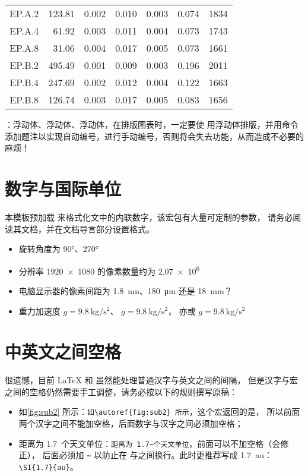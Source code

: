 \begin{longtable}[c]{c*{6}{r}}
        EP.A.2 & 123.81 & 0.002 & 0.010 & 0.003 & 0.074 & 1834 \\
        EP.A.4 & 61.92 & 0.003 & 0.011 & 0.004 & 0.073 & 1743 \\
        EP.A.8 & 31.06 & 0.004 & 0.017 & 0.005 & 0.073 & 1661 \\
        EP.B.2 & 495.49 & 0.001 & 0.009 & 0.003 & 0.196 & 2011 \\
        EP.B.4 & 247.69 & 0.002 & 0.012 & 0.004 & 0.122 & 1663 \\
        EP.B.8 & 126.74 & 0.003 & 0.017 & 0.005 & 0.083 & 1656 \\
        \bottomrule
\end{longtable}

：浮动体、浮动体、浮动体，在排版图表时，一定要使
用浮动体排版，并用命令添加题注以实现自动编号，进行手动编号，否则将会失去功能，从而造成不必要的麻烦！

\section{数字与国际单位}

本模板预加载  来格式化文中的内联数字，该宏包有大量可定制的参数，
请务必阅读其文档，并在文档导言部分设置格式。

\begin{itemize}
  \item 旋转角度为 \ang{90}、\ang{270}
  \item 分辨率 \num{1920x1080} 的像素数量约为 \num{2.07e6}
  \item 电脑显示器的像素间距为 \SI{1.8}{\nm}、\SI{180}{\um} 还是 \SI{18}{\mm}？
  \item 重力加速度 $g=\SI{9.8}{\kg\per\square\second}$、
  $g=\SI[inter-unit-product=\ensuremath{{}\cdot{}}]{9.8}{\kg\per\square\second}$，
  亦或 $g=\SI[per-mode=symbol]{9.8}{\kg\per\square\second}$
\end{itemize}

\section{中英文之间空格}

很遗憾，目前 \LaTeX{} 和 \CTeX{} 虽然能处理普通汉字与英文之间的间隔，
但是汉字与宏之间的空格仍然需要手工调整，请务必按以下的规则撰写原稿：
\begin{itemize}
  \item[\ding{51}] 如\autoref{fig:sub2} 所示：\verb|如\autoref{fig:sub2} 所示|，这个宏返回的是，
  所以前面两个汉字之间不能加空格，后面数字与汉字之间必须加空格；
  \item[\ding{51}] 距离为 1.7~个天文单位：\verb|距离为 1.7~个天文单位|，前面可以不加空格（\CTeX 会修正），
  后面必须加 \verb|~| 以防止在 与之间换行。此时更推荐写成 \SI{1.7}{au}：\verb|\SI{1.7}{au}|。
\end{itemize}

